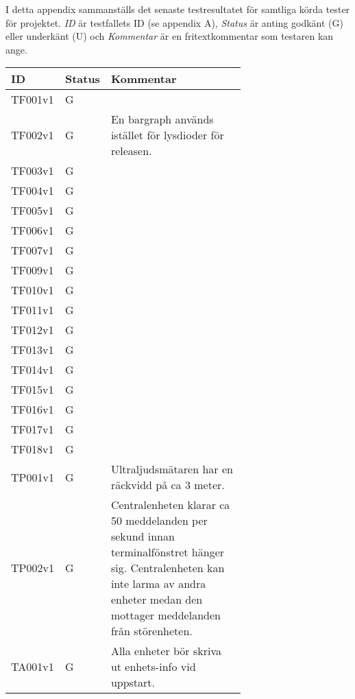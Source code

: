 I detta appendix sammanställs det senaste testresultatet för samtliga körda tester för projektet. \textit{ID} är testfallets ID (se appendix A), \textit{Status} är anting godkänt (G) eller underkänt (U) och \textit{Kommentar} är en fritextkommentar som testaren kan ange.

\begin{table}[h!]
\begin{tabular}{| l | l | p{0.68\linewidth} |}
\hline
\textbf{ID} & \textbf{Status} & \textbf{Kommentar} \\ \hline
TF001v1 & G & \\ \hline
TF002v1 & G & En bargraph används istället för lysdioder för releasen. \\ \hline
TF003v1 & G & \\ \hline
TF004v1 & G & \\ \hline
TF005v1 & G & \\ \hline
TF006v1 & G & \\ \hline
TF007v1 & G & \\ \hline
TF009v1 & G & \\ \hline
TF010v1 & G & \\ \hline
TF011v1 & G & \\ \hline
TF012v1 & G & \\ \hline
TF013v1 & G & \\ \hline
TF014v1 & G & \\ \hline
TF015v1 & G & \\ \hline
TF016v1 & G & \\ \hline
TF017v1 & G & \\ \hline
TF018v1 & G & \\ \hline
TP001v1 & G & Ultraljudsmätaren har en räckvidd på ca 3 meter. \\ \hline
TP002v1 & G & Centralenheten klarar ca 50 meddelanden per sekund innan terminalfönstret hänger sig. Centralenheten kan inte larma av andra enheter medan den mottager meddelanden från störenheten. \\ \hline
TA001v1 & G & Alla enheter bör skriva ut enhets-info vid uppstart. \\ \hline
\end{tabular}
\end{table}
